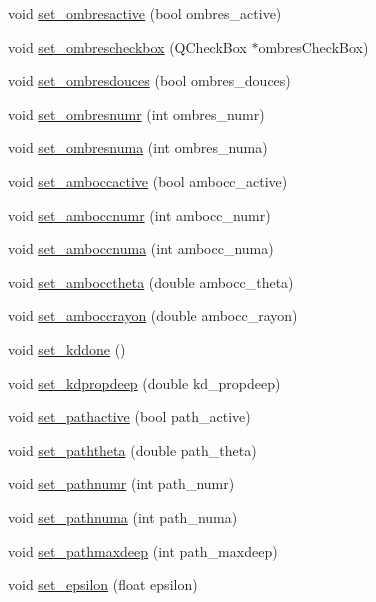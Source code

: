 \begin{DoxyCompactItemize}
void \hyperlink{class_parametres_afa57983a81ff63ac1af4142f3a676f28}{set\_\-ombresactive} (bool ombres\_\-active)
\item 
void \hyperlink{class_parametres_a9d8652c7ebc7ffb6dc8f7b66c71b328a}{set\_\-ombrescheckbox} (QCheckBox $\ast$ombresCheckBox)
\item 
void \hyperlink{class_parametres_a32056c34e447ec31004c6ab9a126f31c}{set\_\-ombresdouces} (bool ombres\_\-douces)
\item 
void \hyperlink{class_parametres_a005d77bcbbe1e9e9edb6c4c55aa7e599}{set\_\-ombresnumr} (int ombres\_\-numr)
\item 
void \hyperlink{class_parametres_aef061b9c1b2dbd3f5b9cad492a97fc6e}{set\_\-ombresnuma} (int ombres\_\-numa)
\item 
void \hyperlink{class_parametres_acf90351c8a8f03784389a4003d64b87a}{set\_\-amboccactive} (bool ambocc\_\-active)
\item 
void \hyperlink{class_parametres_a2c979aeb40e91cbbf0e6fccdb8a01001}{set\_\-amboccnumr} (int ambocc\_\-numr)
\item 
void \hyperlink{class_parametres_a378bb23f3e9ecb3ee8536b4acd8bf179}{set\_\-amboccnuma} (int ambocc\_\-numa)
\item 
void \hyperlink{class_parametres_a95265a8deb7db5b8d510254c055655a6}{set\_\-ambocctheta} (double ambocc\_\-theta)
\item 
void \hyperlink{class_parametres_a5e947f26065405848f81daab4f5776b8}{set\_\-amboccrayon} (double ambocc\_\-rayon)
\item 
void \hyperlink{class_parametres_afb0e12a70eb75b0130e2916ad09561a3}{set\_\-kddone} ()
\item 
void \hyperlink{class_parametres_a4016ae48aeccb8b1d301a86a9524357f}{set\_\-kdpropdeep} (double kd\_\-propdeep)
\item 
void \hyperlink{class_parametres_ae90dda8e314e35eee52a471d0f510666}{set\_\-pathactive} (bool path\_\-active)
\item 
void \hyperlink{class_parametres_ac1c443e33d67bc68228fcf19d1f4b5ec}{set\_\-paththeta} (double path\_\-theta)
\item 
void \hyperlink{class_parametres_a5ea4115f59da12fb8fd6d66292cc028c}{set\_\-pathnumr} (int path\_\-numr)
\item 
void \hyperlink{class_parametres_aee46786f481889f2e474198b647b92a3}{set\_\-pathnuma} (int path\_\-numa)
\item 
void \hyperlink{class_parametres_a528f6b2771b80c7383caea140382ce2f}{set\_\-pathmaxdeep} (int path\_\-maxdeep)
\item 
void \hyperlink{class_parametres_a92c94f1a5c3626acad645f3066b84854}{set\_\-epsilon} (float epsilon)
\end{DoxyCompactItemize}
